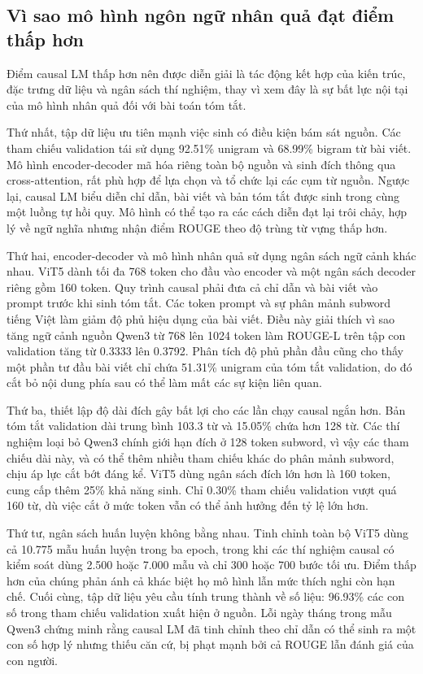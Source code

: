 \documentclass[conference]{IEEEtran}
\begin{document}
\subsection{Vì sao mô hình ngôn ngữ nhân quả đạt điểm thấp hơn}
Điểm causal LM thấp hơn nên được diễn giải là tác động kết hợp của kiến trúc, đặc trưng dữ liệu và ngân sách thí nghiệm, thay vì xem đây là sự bất lực nội tại của mô hình nhân quả đối với bài toán tóm tắt.

Thứ nhất, tập dữ liệu ưu tiên mạnh việc sinh có điều kiện bám sát nguồn. Các tham chiếu validation tái sử dụng 92.51\% unigram và 68.99\% bigram từ bài viết. Mô hình encoder-decoder mã hóa riêng toàn bộ nguồn và sinh đích thông qua cross-attention, rất phù hợp để lựa chọn và tổ chức lại các cụm từ nguồn. Ngược lại, causal LM biểu diễn chỉ dẫn, bài viết và bản tóm tắt được sinh trong cùng một luồng tự hồi quy. Mô hình có thể tạo ra các cách diễn đạt lại trôi chảy, hợp lý về ngữ nghĩa nhưng nhận điểm ROUGE theo độ trùng từ vựng thấp hơn.

Thứ hai, encoder-decoder và mô hình nhân quả sử dụng ngân sách ngữ cảnh khác nhau. ViT5 dành tối đa 768 token cho đầu vào encoder và một ngân sách decoder riêng gồm 160 token. Quy trình causal phải đưa cả chỉ dẫn và bài viết vào prompt trước khi sinh tóm tắt. Các token prompt và sự phân mảnh subword tiếng Việt làm giảm độ phủ hiệu dụng của bài viết. Điều này giải thích vì sao tăng ngữ cảnh nguồn Qwen3 từ 768 lên 1024 token làm ROUGE-L trên tập con validation tăng từ 0.3333 lên 0.3792. Phân tích độ phủ phần đầu cũng cho thấy một phần tư đầu bài viết chỉ chứa 51.31\% unigram của tóm tắt validation, do đó cắt bỏ nội dung phía sau có thể làm mất các sự kiện liên quan.

Thứ ba, thiết lập độ dài đích gây bất lợi cho các lần chạy causal ngắn hơn. Bản tóm tắt validation dài trung bình 103.3 từ và 15.05\% chứa hơn 128 từ. Các thí nghiệm loại bỏ Qwen3 chính giới hạn đích ở 128 token subword, vì vậy các tham chiếu dài này, và có thể thêm nhiều tham chiếu khác do phân mảnh subword, chịu áp lực cắt bớt đáng kể. ViT5 dùng ngân sách đích lớn hơn là 160 token, cung cấp thêm 25\% khả năng sinh. Chỉ 0.30\% tham chiếu validation vượt quá 160 từ, dù việc cắt ở mức token vẫn có thể ảnh hưởng đến tỷ lệ lớn hơn.

Thứ tư, ngân sách huấn luyện không bằng nhau. Tinh chỉnh toàn bộ ViT5 dùng cả 10.775 mẫu huấn luyện trong ba epoch, trong khi các thí nghiệm causal có kiểm soát dùng 2.500 hoặc 7.000 mẫu và chỉ 300 hoặc 700 bước tối ưu. Điểm thấp hơn của chúng phản ánh cả khác biệt họ mô hình lẫn mức thích nghi còn hạn chế. Cuối cùng, tập dữ liệu yêu cầu tính trung thành về số liệu: 96.93\% các con số trong tham chiếu validation xuất hiện ở nguồn. Lỗi ngày tháng trong mẫu Qwen3 chứng minh rằng causal LM đã tinh chỉnh theo chỉ dẫn có thể sinh ra một con số hợp lý nhưng thiếu căn cứ, bị phạt mạnh bởi cả ROUGE lẫn đánh giá của con người.
\end{document}
